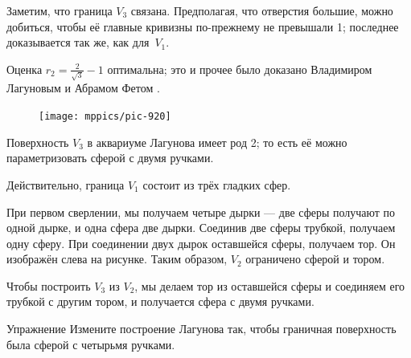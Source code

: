 Заметим, что граница $V_3$ связана.
Предполагая, что отверстия большие, можно добиться, чтобы её главные кривизны по-прежнему не превышали 1; последнее доказывается так же, как для~$V_1$.
\qeds

Оценка $r_2=\tfrac2{\sqrt{3}}-1$ оптимальна;
это и прочее было доказано Владимиром Лагуновым и Абрамом Фетом \cite{lagunov-1960, lagunov-fet-1963, lagunov-fet-1965}.

\begin{figure}
\centering
\vskip-0mm
\texttt{[image: mppics/pic-920]}
\vskip0mm
\end{figure}

Поверхность $V_3$ в аквариуме Лагунова имеет род 2; то есть её можно параметризовать сферой с двумя ручками.

Действительно, граница $V_1$ состоит из трёх гладких сфер.

При первом сверлении, мы получаем четыре дырки --- две сферы получают по одной дырке, и одна сфера две дырки.
Соединив две сферы трубкой, получаем одну сферу.
При соединении двух дырок оставшейся сферы, получаем тор.
Он изображён слева на рисунке.
Таким образом, $V_2$ ограничено сферой и тором.

Чтобы построить $V_3$ из $V_2$, мы делаем тор из оставшейся сферы и соединяем его трубкой с другим тором, и получается сфера с двумя ручками.

\begin{thm}{Упражнение}\label{ex:lagunov-genus4}
Измените построение Лагунова так, чтобы граничная поверхность была сферой с четырьмя ручками.
\end{thm}




